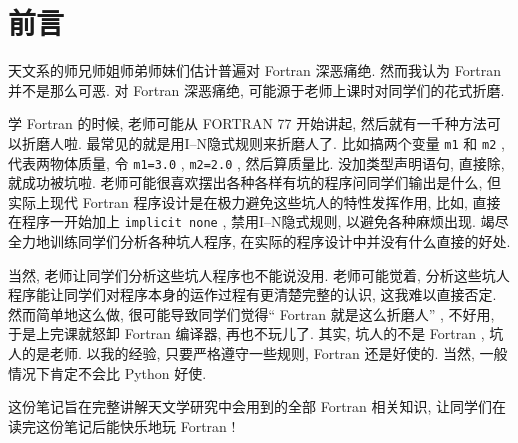 \chapter*{前言}

天文系的师兄师姐师弟师妹们估计普遍对 Fortran 深恶痛绝. 然而我认为 Fortran 并不是那么可恶. 对 Fortran 深恶痛绝, 可能源于老师上课时对同学们的花式折磨.

学 Fortran 的时候, 老师可能从 FORTRAN 77 开始讲起, 然后就有一千种方法可以折磨人啦. 最常见的就是用I--N隐式规则来折磨人了. 比如搞两个变量 \texttt{m1} 和 \texttt{m2} , 代表两物体质量, 令 \texttt{m1=3.0} , \texttt{m2=2.0} , 然后算质量比. 没加类型声明语句, 直接除, 就成功被坑啦. 老师可能很喜欢摆出各种各样有坑的程序问同学们输出是什么, 但实际上现代 Fortran 程序设计是在极力避免这些坑人的特性发挥作用, 比如, 直接在程序一开始加上 \texttt{implicit none} , 禁用I--N隐式规则, 以避免各种麻烦出现. 竭尽全力地训练同学们分析各种坑人程序, 在实际的程序设计中并没有什么直接的好处.

当然, 老师让同学们分析这些坑人程序也不能说没用. 老师可能觉着, 分析这些坑人程序能让同学们对程序本身的运作过程有更清楚完整的认识, 这我难以直接否定. 然而简单地这么做, 很可能导致同学们觉得`` Fortran 就是这么折磨人'' , 不好用, 于是上完课就怒卸 Fortran 编译器, 再也不玩儿了. 其实, 坑人的不是 Fortran , 坑人的是老师. 以我的经验, 只要严格遵守一些规则, Fortran 还是好使的. 当然, 一般情况下肯定不会比 Python 好使.

这份笔记旨在完整讲解天文学研究中会用到的全部 Fortran 相关知识, 让同学们在读完这份笔记后能快乐地玩 Fortran !
